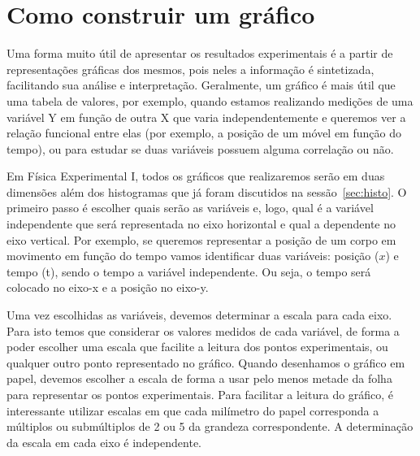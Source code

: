 \section{Como construir um gráfico}\label{plot}

Uma forma muito útil de apresentar os resultados experimentais é a partir de re\-pre\-sen\-ta\-ções gráficas dos mesmos, pois neles a informação é sintetizada, facilitando sua análise e interpretação. Geralmente, um gráfico é mais útil que uma tabela de valores, por exemplo, quando estamos realizando medições de uma variável Y em função de outra X que varia independentemente e queremos ver a relação funcional entre elas (por exemplo, a posição de um móvel em função do tempo), ou para estudar se duas variáveis possuem alguma correlação ou não.

Em Física Experimental I, todos os gráficos que realizaremos serão em duas dimensões além dos histogramas que já foram discutidos na sessão~\ref{sec:histo}. O primeiro passo é escolher quais serão as variáveis e, logo, qual é a variável independente que será representada no eixo horizontal e qual a dependente no eixo vertical.  Por exemplo, se queremos representar a posição de um corpo em movimento em função do tempo vamos identificar duas variáveis:  posição ($x$) e tempo (t), sendo o tempo a variável independente.  Ou seja, o tempo será colocado no eixo-x e a posição no eixo-y. 

Uma vez escolhidas as variáveis, devemos determinar a escala para cada eixo. Para isto temos que considerar os valores medidos de cada variável, de forma a poder escolher uma escala que facilite a leitura dos pontos experimentais, ou qualquer outro ponto representado no gráfico.  Quando desenhamos o gráfico em papel, devemos escolher a escala de forma a usar pelo menos metade da folha para representar os pontos experimentais. Para facilitar a leitura do gráfico, é interessante utilizar escalas em que cada milímetro do papel corresponda a múltiplos ou submúltiplos de 2 ou 5 da grandeza correspondente. A determinação da escala em cada eixo é independente.   

